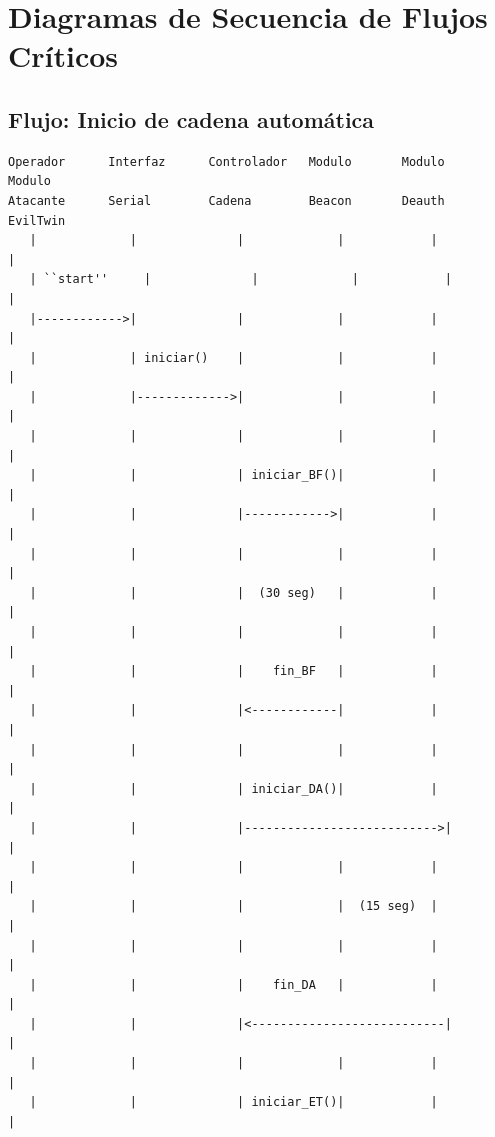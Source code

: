 \documentclass[11pt,a4paper]{article}
\begin{document}
\section{Diagramas de Secuencia de Flujos Críticos}

\subsection{Flujo: Inicio de cadena automática}

\vspace{0.3cm}
\begin{verbatim}
Operador      Interfaz      Controlador   Modulo       Modulo      Modulo
Atacante      Serial        Cadena        Beacon       Deauth      EvilTwin
   |             |              |             |            |            |
   | ``start''     |              |             |            |            |
   |------------>|              |             |            |            |
   |             | iniciar()    |             |            |            |
   |             |------------->|             |            |            |
   |             |              |             |            |            |
   |             |              | iniciar_BF()|            |            |
   |             |              |------------>|            |            |
   |             |              |             |            |            |
   |             |              |  (30 seg)   |            |            |
   |             |              |             |            |            |
   |             |              |    fin_BF   |            |            |
   |             |              |<------------|            |            |
   |             |              |             |            |            |
   |             |              | iniciar_DA()|            |            |
   |             |              |--------------------------->|          |
   |             |              |             |            |            |
   |             |              |             |  (15 seg)  |            |
   |             |              |             |            |            |
   |             |              |    fin_DA   |            |            |
   |             |              |<---------------------------|          |
   |             |              |             |            |            |
   |             |              | iniciar_ET()|            |            |

\end{verbatim}
\end{document}

